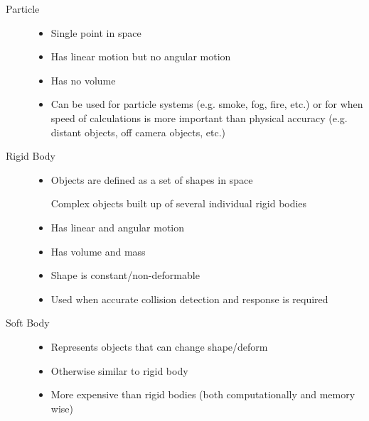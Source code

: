 \documentclass[a4paper]{article}
\begin{document}
\begin{description}
  \item[Particle] \hfill
    \begin{itemize}
      \item
        Single point in space

      \item
        Has linear motion but no angular motion

      \item
        Has no volume

      \item
        Can be used for particle systems (e.g. smoke, fog, fire, etc.) or for
        when speed of calculations is more important than physical accuracy
        (e.g.  distant objects, off camera objects, etc.)

    \end{itemize}

  \item[Rigid Body] \hfill
    \begin{itemize}
      \item
        Objects are defined as a set of shapes in space

        Complex objects built up of several individual rigid bodies

      \item
        Has linear and angular motion

      \item
        Has volume and mass

      \item
        Shape is constant/non-deformable

      \item
        Used when accurate collision detection and response is required

    \end{itemize}

  \item[Soft Body] \hfill
    \begin{itemize}
      \item
        Represents objects that can change shape/deform

      \item
        Otherwise similar to rigid body

      \item
        More expensive than rigid bodies (both computationally and memory wise)

    \end{itemize}

\end{description}
\end{document}

